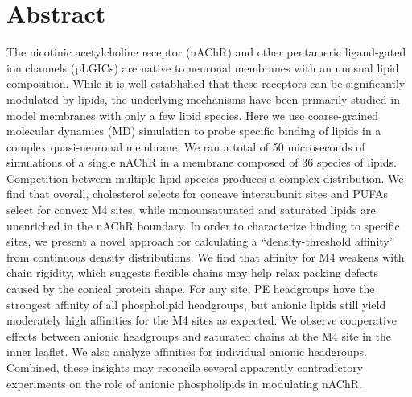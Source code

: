 
\section{Abstract}
The nicotinic acetylcholine receptor (nAChR) and other pentameric ligand-gated ion channels (pLGICs) are native to neuronal membranes with an unusual lipid composition. While it is well-established that these receptors can be significantly modulated by lipids, the underlying mechanisms have been primarily studied in model membranes with only a few lipid species. Here we use coarse-grained molecular dynamics (MD) simulation to probe specific binding of lipids in a complex quasi-neuronal membrane. We ran a total of 50 microseconds of simulations of a single nAChR in a membrane composed of 36 species of lipids. Competition between multiple lipid species produces a complex distribution. We find that overall, cholesterol selects for concave intersubunit sites and PUFAs select for convex M4 sites, while monounsaturated and saturated lipids are unenriched in the nAChR boundary. In order to characterize binding to specific sites, we present a novel approach for calculating a ``density-threshold affinity'' from continuous density distributions. We find that affinity for M4 weakens with chain rigidity, which suggests flexible chains may help relax packing defects caused by the conical protein shape. For any site, PE headgroups have the strongest affinity of all phospholipid headgroups, but anionic lipids still yield moderately high affinities for the M4 sites as expected.  We observe cooperative effects between anionic headgroups and saturated chains at the M4 site in the inner leaflet. We also analyze affinities for individual anionic headgroups. Combined, these insights may reconcile several apparently contradictory experiments on the role of anionic phospholipids in modulating nAChR.

